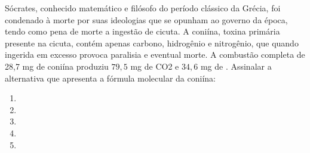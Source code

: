 Sócrates, conhecido matemático e filósofo do período clássico da Grécia, foi condenado à morte por suas ideologias que se opunham ao governo da época, tendo como pena de morte a ingestão de cicuta. A coniína, toxina primária presente na cicuta, contém apenas carbono, hidrogênio e nitrogênio, que quando ingerida em excesso provoca paralisia e eventual morte. A combustão completa de 28,7 mg de coniína produziu $79,5$ mg de CO2 e $34,6$ mg de . Assinalar a alternativa que apresenta a fórmula molecular da coniína:

\begin{enumerate}[label = (\alph*)]	
	\item {}
	\item {}
	\item {}
	\item {}
	\item {}
\end{enumerate}
